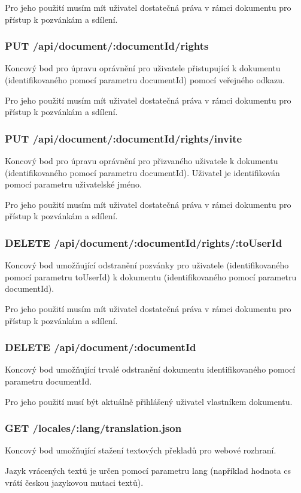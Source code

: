 Pro jeho použití musím mít uživatel dostatečná práva v rámci dokumentu pro přístup k pozvánkám a sdílení.

\subsubsection{PUT /api/document/:documentId/rights}

Koncový bod pro úpravu oprávnění pro uživatele přistupující k dokumentu (identifikovaného pomocí parametru documentId) pomocí veřejného odkazu.

Pro jeho použití musím mít uživatel dostatečná práva v rámci dokumentu pro přístup k pozvánkám a sdílení.

\subsubsection{PUT /api/document/:documentId/rights/invite}

Koncový bod pro úpravu oprávnění pro přizvaného uživatele k dokumentu (identifikovaného pomocí parametru documentId).
Uživatel je identifikován pomocí parametru uživatelské jméno.

Pro jeho použití musím mít uživatel dostatečná práva v rámci dokumentu pro přístup k pozvánkám a sdílení.

\subsubsection{DELETE /api/document/:documentId/rights/:toUserId}

Koncový bod umožňující odstranění pozvánky pro uživatele (identifikovaného pomocí parametru toUserId) k dokumentu (identifikovaného pomocí parametru documentId).

Pro jeho použití musím mít uživatel dostatečná práva v rámci dokumentu pro přístup k pozvánkám a sdílení.

\subsubsection{DELETE /api/document/:documentId}

Koncový bod umožňující trvalé odstranění dokumentu identifikovaného pomocí parametru documentId.

Pro jeho použití musí být aktuálně přihlášený uživatel vlastníkem dokumentu.

\subsubsection{GET /locales/:lang/translation.json}

Koncový bod umožňující stažení textových překladů pro webové rozhraní.

Jazyk vrácených textů je určen pomocí parametru lang (například hodnota cs vrátí českou jazykovou mutaci textů).
